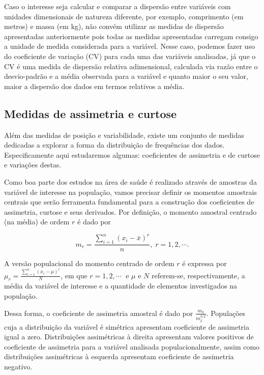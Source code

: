 \documentclass[
  letterpaper,
  DIV=11,
  numbers=noendperiod]{scrreprt}
\begin{document}
Caso o interesse seja calcular e comparar a dispersão entre variáveis
com unidades dimensionais de natureza diferente, por exemplo,
comprimento (em metros) e massa (em kg), não convém utilizar as medidas
de dispersão apresentadas anteriormente pois todas as medidas
apresentadas carregam consigo a unidade de medida considerada para a
variável. Nesse caso, podemos fazer uso do coeficiente de variação (CV)
para cada uma das variáveis analisadas, já que o CV é uma medida de
dispersão relativa adimensional, calculada via razão entre o
desvio-padrão e a média observada para a variável e quanto maior o seu
valor, maior a dispersão dos dados em termos relativos a média.

\hypertarget{medidas-de-assimetria-e-curtose}{%
\subsection{Medidas de assimetria e
curtose}\label{medidas-de-assimetria-e-curtose}}

Além das medidas de posição e variabilidade, existe um conjunto de
medidas dedicadas a explorar a forma da distribuição de frequências dos
dados. Especificamente aqui estudaremos algumas: coeficientes de
assimetria e de curtose e variações destas.

Como boa parte dos estudos na área de saúde é realizado através de
amostras da variável de interesse na população, vamos precisar definir
os momentos amostrais centrais que serão ferramenta fundamental para a
construção dos coeficientes de assimetria, curtose e seus derivados. Por
definição, o momento amostral centrado (na média) de ordem \(r\) é dado
por

\[
m_r = \frac{\sum_{i = 1}^n (x_i - \bar{x})^r}{n}, \; r = 1, 2, \cdots.
\]

A versão populacional do momento centrado de ordem \(r\) é expressa por
\(\mu_r = \frac{\sum_{i = 1}^n (x_i - \mu)^r}{N}\), em que
\(r = 1, 2, \cdots \;\) e \(\mu\) e \(N\) referem-se, respectivamente, a
média da variável de interesse e a quantidade de elementos investigados
na população.

Dessa forma, o coeficiente de assimetria amostral é dado por
\(\frac{m_3}{m_2^{3/2}}\). Populações cuja a distribuição da variável é
simétrica apresentam coeficiente de assimetria igual a zero.
Distribuições assimétricas à direita apresentam valores positivos de
coeficiente de assimetria para a variável analisada populacionalmente,
assim como distribuições assimétricas à esquerda apresentam coeficiente
de assimetria negativo.
\end{document}
